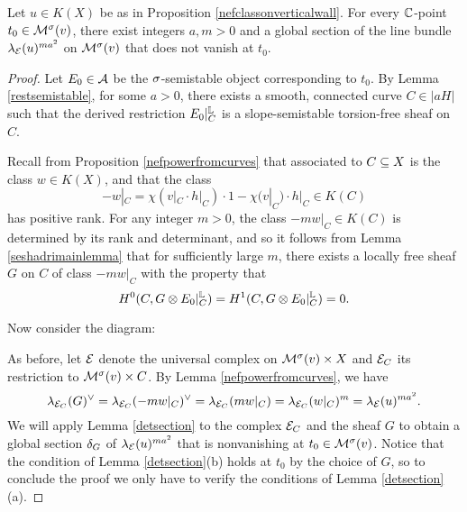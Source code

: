 \begin{prop}\label{globalgen}
    Let $u \in K(X)$ be as in Proposition \ref{nefclassonverticalwall}. For every $\mathbb{C}$-point $t_0 \in \mathcal{M}^\sigma(v)$, there exist integers $a, m > 0$ and a global section of the line bundle $\lambda_{\mathcal{E}}(u)^{m a^2}$ on $\mathcal{M}^\sigma(v)$ that does not vanish at $t_0$.
\end{prop}
\begin{proof}
    Let $E_0 \in \mathcal{A}$ be the $\sigma$-semistable object corresponding to $t_0$. By Lemma \ref{restsemistable}, for some $a > 0$, there exists a smooth, connected curve $C \in |a H|$ such that the derived restriction $E_0|_C^{\mathbb{L}}$ is a slope-semistable torsion-free sheaf on $C$.
    
    Recall from Proposition \ref{nefpowerfromcurves} that associated to $C \subseteq X$ is the class $w \in K(X)$, and that the class 
    \[ -w|_C = \chi(v|_C \cdot h|_C) \cdot 1 - \chi(v|_C) \cdot h|_C \in K(C) \] 
    has positive rank. For any integer $m > 0$, the class $-m w|_C \in K(C)$ is determined by its rank and determinant, and so it follows from Lemma \ref{seshadrimainlemma} that for sufficiently large $m$, there exists a locally free sheaf $G$ on $C$ of class $-m w|_C$ with the property that
    \[ H^0(C, G \otimes E_0|_C^{\mathbb{L}}) = H^1(C, G \otimes E_0|_C^{\mathbb{L}}) = 0. \]
    
    Now consider the diagram:
    \begin{center}
    \end{center}
    As before, let $\mathcal{E}$ denote the universal complex on $\mathcal{M}^\sigma(v) \times X$ and $\mathcal{E}_C$ its restriction to $\mathcal{M}^\sigma(v) \times C$. By Lemma \ref{nefpowerfromcurves}, we have
    \[ \lambda_{\mathcal{E}_C}(G)^\vee = \lambda_{\mathcal{E}_C}(-m w|_C)^\vee = \lambda_{\mathcal{E}_C}(m w|_C) = \lambda_{\mathcal{E}_C}(w|_C)^m = \lambda_{\mathcal{E}}(u)^{m a^2}. \]
    We will apply Lemma \ref{detsection} to the complex $\mathcal{E}_C$ and the sheaf $G$ to obtain a global section $\delta_G$ of $\lambda_{\mathcal{E}}(u)^{m a^2}$ that is nonvanishing at $t_0 \in \mathcal{M}^\sigma(v)$. Notice that the condition of Lemma \ref{detsection}(b) holds at $t_0$ by the choice of $G$, so to conclude the proof we only have to verify the conditions of Lemma \ref{detsection}(a).
    

\end{proof}
